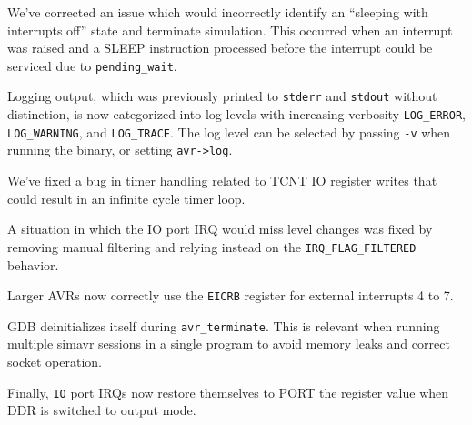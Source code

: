 We've corrected an issue which would incorrectly identify an ``sleeping with
interrupts off'' state and terminate simulation. This occurred when an interrupt
was raised and a SLEEP instruction processed before the interrupt could be
serviced due to \lstinline|pending_wait|.

Logging output, which was previously printed to \lstinline|stderr| and
\lstinline|stdout| without distinction, is now categorized into log levels with
increasing verbosity \lstinline|LOG_ERROR|, \lstinline|LOG_WARNING|, and
\lstinline|LOG_TRACE|. The log level can be selected by passing \verb|-v|
when running the \simavr binary, or setting \lstinline|avr->log|.

We've fixed a bug in timer handling related to TCNT \ac{IO} register writes that could
result in an infinite cycle timer loop.

A situation in which the \ac{IO} port \ac{IRQ} would miss level changes was fixed by
removing manual filtering and relying instead on the \lstinline|IRQ_FLAG_FILTERED|
behavior.

Larger \acp{AVR} now correctly use the \lstinline|EICRB| register for external
interrupts 4 to 7.

\ac{GDB} deinitializes itself during \lstinline|avr_terminate|. This is relevant when running multiple simavr sessions in a single program to avoid memory leaks and correct socket operation.

Finally, \lstinline|IO| port \acp{IRQ} now restore themselves to PORT
the register value when \ac{DDR} is switched to output mode.
